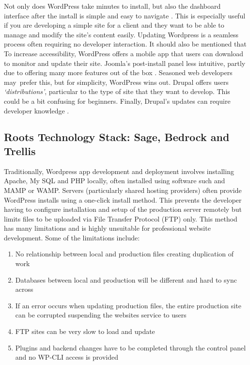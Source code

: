 \documentclass[fontsize=11pt]{extarticle}
\numberwithin{figure}{section} %
\providecommand{\tightlist}{%
  \setlength{\itemsep}{0pt}\setlength{\parskip}{0pt}}
\begin{document}
Not only does WordPress take minutes to install, but also the dashboard
interface after the install is simple and easy to navigate \cite{p3}.
This is especially useful if you are developing a simple site for a
client and they want to be able to manage and modify the site's content
easily. Updating Wordpress is a seamless process often requiring no
developer interaction. It should also be mentioned that To increase
accessibility, WordPress offers a mobile app that users can download to
monitor and update their site. Joomla's post-install panel less
intuitive, partly due to offering many more features out of the box
\cite{p2}. Seasoned web developers may~prefer this, but for simplicity,
WordPress wins out. Drupal offers users \emph{`distributions'},
particular to the type of site that they want to develop. This could be
a bit confusing for beginners. Finally, Drupal's updates can require
developer knowledge \cite{p4}.

\hypertarget{roots-technology-stack-sage-bedrock-and-trellis}{%
\subsection{Roots Technology Stack: Sage, Bedrock and
Trellis}\label{roots-technology-stack-sage-bedrock-and-trellis}}

Traditionally, Wordpress app development and deployment involves
installing Apache, My SQL and PHP locally, often installed using
software such and MAMP or WAMP. Servers (particularly shared hosting
providers) often provide WordPress installs using a one-click install
method. This prevents the developer having to configure installation and
setup of the production server remotely but limits files to be uploaded
via File Transfer Protocol (FTP) only. This method has many limitations
and is highly unsuitable for professional website development. Some of
the limitations include:

\begin{enumerate}

\tightlist
\item
  No relationship between local and production files creating
  duplication of work
\item
  Databases between local and production will be different and hard to
  sync across
\item
  If an error occurs when updating production files, the entire
  production site can be corrupted suspending the websites service to
  users
\item
  FTP sites can be very slow to load and update
\item
  Plugins and backend changes have to be completed through the control
  panel and no WP-CLI access is provided \cite{p13}
\end{enumerate}
\end{document}
